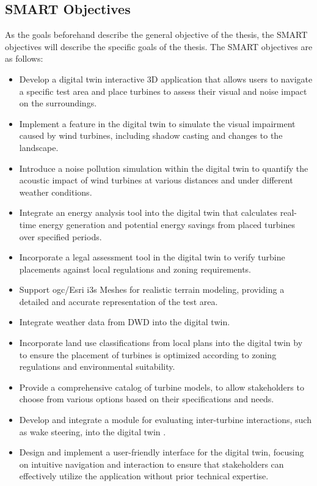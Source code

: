 \documentclass[11pt, titlepage, a4paper]{scrartcl}
\begin{document}
\begin{linenumbers}
    \subsection{SMART Objectives}
    As the goals beforehand describe the general objective of the thesis, the SMART objectives will describe the specific goals of the thesis. The SMART objectives are as follows:
    \begin{itemize}[label={--}]
        \item Develop a digital twin interactive 3D application  that allows users to navigate a specific test area and place turbines to assess their visual and noise impact on the surroundings.
        \item Implement a feature  in the digital twin to simulate the visual impairment caused by wind turbines, including shadow casting and changes to the landscape.
        \item Introduce a noise pollution simulation within the digital twin to quantify the acoustic impact of wind turbines at various distances and under different weather conditions.
        \item Integrate an energy analysis tool into the digital twin  that calculates real-time energy generation and potential energy savings from placed turbines over specified periods.
        \item Incorporate a legal assessment tool  in the digital twin to verify turbine placements against local regulations and zoning requirements.
        \item Support \gls{ogc}/Esri \gls{i3s} Meshes for realistic terrain modeling, providing a detailed and accurate representation of the test area.
        \item Integrate weather data from DWD into the digital twin.
        \item Incorporate land use classifications from local plans into the digital twin by to ensure the placement of turbines is optimized according to zoning regulations and environmental suitability.
        \item Provide a comprehensive catalog of turbine models, to allow stakeholders to choose from various options based on their specifications and needs.
        \item Develop and integrate a module for evaluating inter-turbine interactions, such as wake steering, into the digital twin \cite{howlandWindFarmPower2019a}.
        \item  Design and implement a user-friendly interface for the digital twin, focusing on intuitive navigation and interaction to ensure that stakeholders can effectively utilize the application without prior technical expertise.

\end{itemize}
\end{linenumbers}
\end{document}
